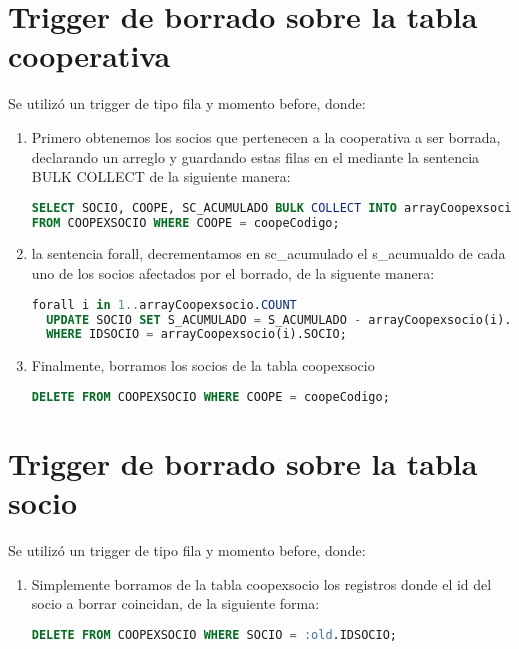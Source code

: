 \documentclass{article}
\begin{document}
\section{Trigger de borrado sobre la tabla cooperativa}
Se utilizó un trigger de tipo fila y momento before, donde:
\begin{enumerate}
    \item Primero obtenemos los socios que pertenecen a la cooperativa a ser borrada, declarando un arreglo y guardando estas filas en el mediante la sentencia BULK COLLECT de la siguiente manera:
    \begin{lstlisting}[language=SQL]
SELECT SOCIO, COOPE, SC_ACUMULADO BULK COLLECT INTO arrayCoopexsocio
FROM COOPEXSOCIO WHERE COOPE = coopeCodigo;   \end{lstlisting}
    \item la sentencia forall, decrementamos en sc\_acumulado  el s\_acumualdo de cada uno de los socios afectados por el borrado, de la siguente manera:
    \begin{lstlisting}[language=SQL]
forall i in 1..arrayCoopexsocio.COUNT
  UPDATE SOCIO SET S_ACUMULADO = S_ACUMULADO - arrayCoopexsocio(i).SC_ACUMULADO
  WHERE IDSOCIO = arrayCoopexsocio(i).SOCIO;\end{lstlisting}
  \item Finalmente, borramos los socios de la tabla coopexsocio
  \begin{lstlisting}[language=SQL]
DELETE FROM COOPEXSOCIO WHERE COOPE = coopeCodigo;    \end{lstlisting}
\end{enumerate}
\section{Trigger de borrado sobre la tabla socio}
Se utilizó un trigger de tipo fila y momento before, donde:
\begin{enumerate}
    \item Simplemente borramos de la tabla coopexsocio los registros donde el id del socio a borrar coincidan, de la siguiente forma:
    \begin{lstlisting}[language=SQL]
    DELETE FROM COOPEXSOCIO WHERE SOCIO = :old.IDSOCIO;    \end{lstlisting}
\end{enumerate}
\end{document}
